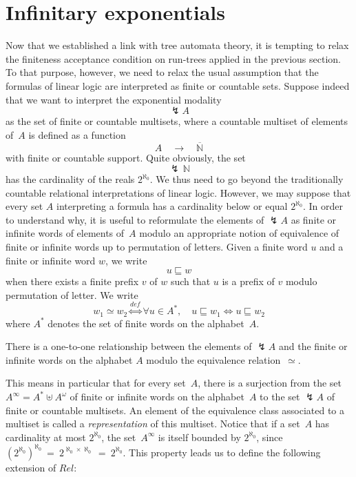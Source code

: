 \documentclass[runningheads,a4paper]{llncs}
\newcommand{\superbang}{\lightning} \newcommand{\modality}{\Box}
\newcommand{\cardreals}{2^{\aleph_0}}
\begin{document}
\section{Infinitary exponentials}
\label{section/infinitary-rel}
Now that we established a link with tree automata theory, it is tempting to relax the finiteness acceptance condition
on run-trees applied in the previous section.
To that purpose, however, we need to relax the usual assumption that the formulas of linear logic
are interpreted as finite or countable sets.
Suppose indeed that we want to interpret the exponential modality
$$\superbang A$$
as the set of finite or countable multisets, where a countable multiset
of elements of~$A$ is defined as a function
$$
A \quad \longrightarrow \quad \overline{\mathbb{N}}
$$
with finite or countable support.
Quite obviously, the set
$$
\superbang \, \mathbb{N}
$$
has the cardinality of the reals $\cardreals$.
We thus need to go beyond the traditionally countable relational interpretations of linear logic.
However, we may suppose that every set $A$ interpreting a formula has a cardinality 
below or equal $\cardreals$.
In order to understand why, it is useful to reformulate the elements of $\superbang A$
as finite or infinite words of elements of~$A$ modulo an appropriate notion of equivalence
of finite or infinite words up to permutation of letters.
Given a finite word $u$ and a finite or infinite word $w$, we write
$$
u \sqsubseteq w
$$
when there exists a finite prefix $v$ of $w$ such that $u$ is a prefix of $v$ modulo permutation of letter.
We write
$$
w_1 \simeq w_2 \stackrel{def}{\iff} \forall u \in A^{*}, \quad u\sqsubseteq w_1 \iff  u\sqsubseteq w_2
$$
where $A^{*}$ denotes the set of finite words on the alphabet~$A$.
\begin{proposition}
There is a one-to-one relationship between the elements of $\superbang A$
and the finite or infinite words on the alphabet $A$ modulo the equivalence relation~$\simeq$.
\end{proposition}
This means in particular that for every set~$A$,
there is a surjection from the set~$A^{\infty}=A^{\ast}\uplus A^{\omega}$
of finite or infinite words on the alphabet~$A$ to the set $\superbang A$
of finite or countable multisets.
An element of the equivalence class associated to a multiset is called a \emph{representation} of this multiset.
Notice that if a set~$A$ has cardinality at most $\cardreals$, the set~$A^{\infty}$
is itself bounded by $\cardreals$, since $(\cardreals)^{\aleph_0}\ =\ 2^{\aleph_0 \times \aleph_0}\ =\ \cardreals$.
This property leads us to define the following extension of $Rel$:
\end{document}
